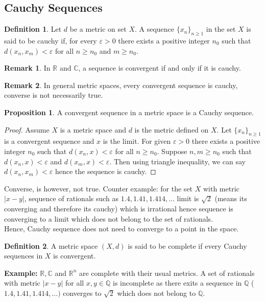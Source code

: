 \documentclass[12pt]{report}
\theoremstyle{definition}
\newtheorem{defn}{Definition}
\newtheorem*{rem}{Remark}
\newtheorem{prop}{Proposition}
\begin{document}
\subsection*{Cauchy Sequences}
\begin{defn}
    Let $d$ be a metric on set $X$. A sequence $\{x_n\}_{n \geq 1}$ in the set $X$ is said to be cauchy if, for every $\varepsilon > 0$ there exists a positive integer $n_0$ such that $d(x_n,x_m)< \varepsilon$ for all $n \geq n_0$ and $m \geq n_0$.
\end{defn}
\begin{rem}
    In $\mathbb{R}$ and $\mathbb{C}$, a sequence is convergent if and only if it is cauchy.
\end{rem}
\begin{rem}
    In general metric spaces, every convergent sequence is cauchy, converse is not necessarily true.
\end{rem}
\begin{prop}
    A convergent sequence in a metric space is a Cauchy sequence.
\end{prop}
\begin{proof}
    Assume $X$ is a metric space and $d$ is the metric defined on $X$. Let $\{x_n\}_{n \geq 1}$ is a convergent sequence and $x$ is the limit. For given $\varepsilon > 0$ there exists a positive integer $n_0$ such that $d(x_n, x) < \varepsilon$ for all $n \geq n_0$. Suppose $n,m \geq n_0$ such that $d(x_n, x) < \varepsilon$ and $d(x_m, x) < \varepsilon$. Then using triangle inequality, we can say $d(x_n, x_m) < \varepsilon$ hence the sequence is cauchy. 
\end{proof}
Converse, is however, not true. Counter example: for the set $X$ with metric $|x - y|$, sequence of rationals such as $1.4, 1.41, 1.414, \dots $ limit is $\sqrt{2}$ (means its converging and therefore its cauchy) which is irrational hence sequence is converging to a limit which does not belong to the set of rationals.\\
Hence, Cauchy sequence does not need to converge to a point in the space.
\begin{defn}
    A metric space $(X,d)$ is said to be complete if every Cauchy sequences in $X$ is convergent.
\end{defn}
\textbf{Example:} $\mathbb{R},\mathbb{C}$ and $\mathbb{R}^n$ are complete with their usual metrics. A set of rationals with metric $|x - y|$ for all $x,y \in \mathbb{Q}$ is incomplete as there exits a sequence in $\mathbb{Q}$ ($1.4, 1.41, 1.414, \dots)$ converges to $\sqrt{2}$ which does not belong to $\mathbb{Q}$.
\end{document}
